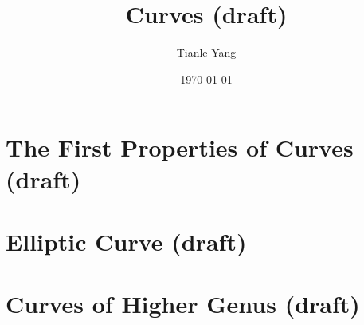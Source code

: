 \documentclass[sectionlevel=chapter]{noteformyself}
\title{Curves (draft)}
\author{Tianle Yang}
\date{\today}
\begin{document}
    \maketitle

    \tableofcontents

    \section{The First Properties of Curves (draft)}
    
    \section{Elliptic Curve (draft)}
    
    \section{Curves of Higher Genus (draft)}
    

    
\end{document}
